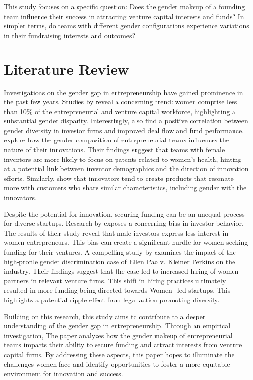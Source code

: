 This study focuses on a specific question:   Does the gender makeup of a founding team influence their success in attracting venture capital interests and funds?  In simpler terms, do teams with different gender configurations experience variations in their fundraising interests and outcomes?

\section{Literature Review} \label{sec:literature}
\hspace *{0mm} Investigations on the gender gap in entrepreneurship have gained prominence in the past few years. Studies by \cite{gompers2017diversity} reveal a concerning trend: women comprise less than 10\% of the entrepreneurial and venture capital workforce, highlighting a substantial gender disparity. Interestingly, \cite{gompers2017diversity} also find a positive correlation between gender diversity in investor firms and improved deal flow and fund performance. \cite{koning2019} explore how the gender composition of entrepreneurial teams influences the nature of their innovations. Their findings suggest that teams with female inventors are more likely to focus on patents related to women's health, hinting at a potential link between inventor demographics and the direction of innovation efforts. Similarly, \cite{einio2019} show that innovators tend to create products that resonate more with customers who share similar characteristics, including gender with the innovators.

Despite the potential for innovation, securing funding can be an unequal process for diverse startups. Research by \cite{ewens2020} exposes a concerning bias in investor behavior. The results of their study reveal that male investors express less interest in women entrepreneurs. This bias can create a significant hurdle for women seeking funding for their ventures. A compelling study by \cite{calder2021} examines the impact of the high-profile gender discrimination case of Ellen Pao v. Kleiner Perkins on the industry. Their findings suggest that the case led to increased hiring of women partners in relevant venture firms. This shift in hiring practices ultimately resulted in more funding being directed towards Women$-$led startups. This highlights a potential ripple effect from legal action promoting diversity. 

Building on this research, this study aims to contribute to a deeper understanding of the gender gap in entrepreneurship. Through an empirical investigation, The paper analyzes how the gender makeup of entrepreneurial teams impacts their ability to secure funding and attract interests from venture capital firms. By addressing these aspects, this paper hopes to illuminate the challenges women face and identify opportunities to foster a more equitable environment for innovation and success.

